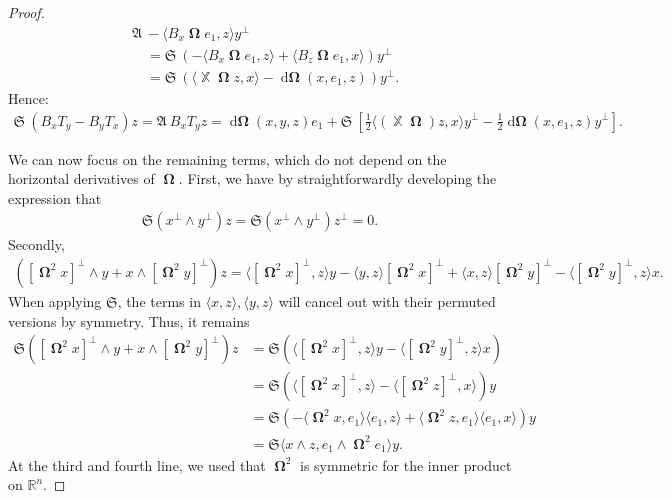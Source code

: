 \documentclass[12pt]{amsart}
\numberwithin{numbering}{section}
\theoremstyle{plain}
\theoremstyle{definition}
\theoremstyle{remark}
\numberwithin{equation}{section}
\DeclareMathOperator{\xx}{\mathbb{X}}
\DeclareMathOperator{\oo}{\mathbf{\Omega}}
\DeclareMathOperator{\doo}{d\mathbf{\Omega}}
\newcommand{\R}{\mathbb{R}}
\newcommand{\frk}[1]{\mathfrak{#1}}
\begin{document}
\begin{proof}
\begin{align*}
& \frk{A} \ - \langle B_x \oo e_1, z \rangle y^\perp \\ 
&\quad = \frk{S} \ (- \langle B_x \oo e_1, z \rangle + \langle B_z \oo e_1, x \rangle) y^\perp \\ 
&\quad = \frk{S} \ (\langle \xx \oo z, x \rangle - \doo(x, e_1, z)) y^\perp.
\end{align*}
Hence:
\begin{align*}
\frk{S} \ (B_x T_y - B_y T_x) z = \frk{A} \ B_x T_y z 
= \doo(x, y, z) e_1 + \frk{S} \ \left [ \frac{1}{2} \langle (\xx \oo) z, x \rangle y^\perp - \frac{1}{2} \doo(x, e_1, z) y^\perp \right ].
\end{align*}

\bigskip 

We can now focus on the remaining terms, which do not depend on the horizontal derivatives of $\oo$. First, we have by straightforwardly developing the expression that
\begin{align*}
\frk{S} (x^\perp \wedge y^\perp) z = \frk{S} (x^\perp \wedge y^\perp) z^\perp = 0.
\end{align*} 
Secondly,
\begin{align*}
([\oo^2 x]^\perp \wedge y + x \wedge [\oo^2 y]^\perp)z 
= \langle [\oo^2 x]^\perp , z \rangle y - \langle y, z \rangle [\oo^2 x]^\perp + \langle x, z \rangle [\oo^2 y]^\perp - \langle [\oo^2 y]^\perp, z \rangle x.
\end{align*}
When applying $\frk{S}$, the terms in $\langle x, z \rangle, \langle y, z \rangle$ will cancel out with their permuted versions by symmetry. Thus, it remains 
\begin{align*}
\frk{S} ([\oo^2 x]^\perp \wedge y + x \wedge [\oo^2 y]^\perp)z 
&= \frk{S} ( \langle [\oo^2 x]^\perp , z \rangle y - \langle [\oo^2 y]^\perp, z \rangle x) \\ 
&= \frk{S} (\langle [\oo^2 x]^\perp, z \rangle - \langle [\oo^2 z]^\perp, x \rangle) y \\ 
&= \frk{S} (- \langle \oo^2 x, e_1 \rangle \langle e_1, z \rangle + \langle \oo^2 z, e_1 \rangle \langle e_1, x \rangle) y \\ 
&= \frk{S} \langle x \wedge z, e_1 \wedge \oo^2 e_1 \rangle y.
\end{align*}
At the third and fourth line, we used that $\oo^2$ is symmetric for the inner product on $\R^n$.

\medskip 


\end{proof}
\end{document}
